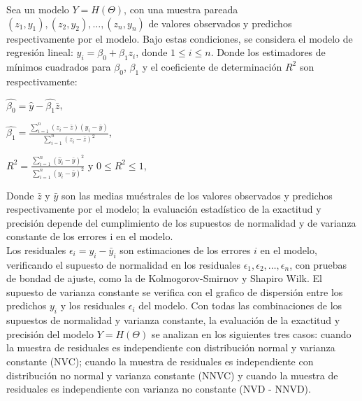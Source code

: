Sea un modelo $Y = H(\Theta )$, con una muestra pareada $(z_{1}, y_{1}), (z_{2}, y_{2}) , \dots , (z_{n}, y_{n})$ de valores observados y predichos respectivamente por el modelo. Bajo estas condiciones, se considera el modelo de regresión lineal: $y_{i}= \beta_{0} + \beta_{1}z_{i}$, donde $ 1 \leq i \leq n$. Donde  los estimadores de mínimos cuadrados para $\beta_{0}$,  $\beta_{1}$ y el coeficiente de determinación $R^{2}$ son respectivamente: \\

\begin{center}
	$\hat{\beta_{0}} = \hat{y} - \hat{\beta_{1}} \bar{z} $, \\
\end{center}

\begin{center}
	$ \hat{\beta_{1}} = \frac{\sum_{i=1}^{n} (z_{i} - \bar{z} ) (y_{i} - \bar{y})} {  \sum_{i=1}^{n} (z_{i} - \bar{z} )^{2} }$, \\
\end{center}

\begin{center}
	$R^{2} = \frac{ \sum_{i=1}^{n} ( \hat{y}_{i} - \bar{y})^{2}} { \sum_{i=1}^{n} ( y_{i} - \bar{y})^{2}  }$  y  $ 0 \leq R^{2} \leq 1$,
\end{center}


Donde $ \bar{z}$ y $ \bar{y}$ son las medias muéstrales de los valores observados y predichos respectivamente por el modelo; la evaluación estadístico de la exactitud y precisión depende del cumplimiento de los supuestos de normalidad y de varianza constante de los errores i en el modelo. \\


Los residuales $\epsilon_{i} = y_{i} - \bar{y}_{i}$ son estimaciones de los errores $i$ en el modelo, verificando el  supuesto de normalidad en los residuales $\epsilon_{1}, \epsilon_{2} , \dots, \epsilon_{n} $, con pruebas de bondad de ajuste, como la de Kolmogorov-Smirnov y Shapiro Wilk. El supuesto de varianza constante se verifica con el grafico de dispersión entre los predichos $y_{i}$ y los residuales $\epsilon_{i}$ del modelo. Con todas las combinaciones de los supuestos de normalidad y varianza constante, la evaluación de la exactitud y precisión del modelo $Y = H(\Theta )$ se analizan en los siguientes tres casos: cuando la muestra de residuales es independiente con distribución normal y varianza constante (NVC); cuando la muestra de residuales es independiente con distribución no normal y varianza constante (NNVC) y cuando la muestra
de residuales es independiente con varianza no constante (NVD - NNVD).

